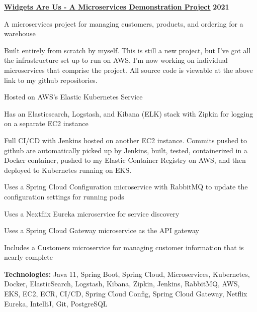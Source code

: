 %
    \headerrow
        {\textbf{\href{https://github.com/johatfie/widgets-are-us}{Widgets Are Us - A Microservices Demonstration Project}}}
        {\textbf{2021}}
    \begin{itemize*}
        \item A microservices project for managing customers, products, and ordering for a warehouse
        \item Built entirely from scratch by myself.  This is still a new project, but I've got all the infrastructure set up to run
            on AWS.  I'm now working on individual microservices that comprise the project.  All source code is viewable
            at the above link to my github repositories.
        \item Hosted on AWS's Elastic Kubernetes Service
        \item Has an Elasticsearch, Logstash, and Kibana (ELK) stack with Zipkin for logging on a separate EC2 instance
        \item Full CI/CD with Jenkins hosted on another EC2 instance.  Commits pushed to github are automatically picked up by
            Jenkins, built, tested, containerized in a Docker container, pushed to my Elastic Container Registry on AWS, and then
            deployed to Kubernetes running on EKS.
        \item Uses a Spring Cloud Configuration microservice with RabbitMQ to update the configuration settings for running pods
        \item Uses a Nextflix Eureka microservice for service discovery
        \item Uses a Spring Cloud Gateway microservice as the API gateway
        \item Includes a Customers microservice for managing customer information that is nearly complete
    \end{itemize*}

    \hspace{1.0em}
        {\textbf{Technologies:} Java 11, Spring Boot, Spring Cloud, Microservices, Kubernetes, Docker, ElasticSearch,
        Logstash, Kibana, Zipkin, Jenkins, RabbitMQ, AWS, EKS, EC2, ECR, CI/CD, Spring Cloud Config, Spring Cloud Gateway,
        Netflix Eureka, IntelliJ, Git, PostgreSQL}


